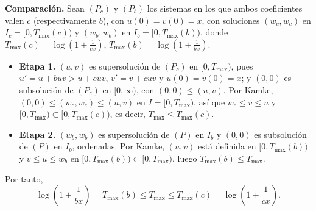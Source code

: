 {    \textbf{Comparación.} Sean $(P_c)$ y $(P_b)$ los sistemas en los que ambos coeficientes valen $c$ (respectivamente $b$), con $u(0) = v(0) = x$, con soluciones $(w_c, w_c)$ en $I_c = [0, T_{\max}(c))$ y $(w_b, w_b)$ en $I_b = [0, T_{\max}(b))$, donde $T_{\max}(c) = \log(1 + \frac{1}{cx})$, $T_{\max}(b) = \log(1 + \frac{1}{bx})$.
    \begin{itemize}
        \item \textbf{Etapa 1.} $(u, v)$ es supersolución de $(P_c)$ en $[0, T_{\max})$, pues $u' = u + b u v > u + c u v$, $v' = v + c u v$ y $u(0) = v(0) = x$; y $(0, 0)$ es subsolución de $(P_c)$ en $[0, \infty)$, con $(0,0) \leq (u, v)$. Por Kamke, $(0, 0) \leq (w_c, w_c) \leq (u, v)$ en $I = [0, T_{\max})$, así que $\boxed{w_c \leq v \leq u}$ y $[0, T_{\max}) \subset [0, T_{\max}(c))$, es decir, $\boxed{T_{\max} \leq T_{\max}(c)}$.
        \item \textbf{Etapa 2.} $(w_b, w_b)$ es supersolución de $(P)$ en $I_b$ y $(0,0)$ es subsolución de $(P)$ en $I_b$, ordenadas. Por Kamke, $(u, v)$ está definida en $[0, T_{\max}(b))$ y $\boxed{v \leq u \leq w_b}$ en $[0, T_{\max}(b)) \subset [0, T_{\max})$, luego $\boxed{T_{\max}(b) \leq T_{\max}}$.
    \end{itemize}
    Por tanto,
    \[
        \log \left( 1 + \frac{1}{b x} \right) = T_{\max}(b) \leq T_{\max} \leq T_{\max}(c) = \log \left( 1 + \frac{1}{c x} \right).
    \]
    \begin{center}
    \end{center}

}
